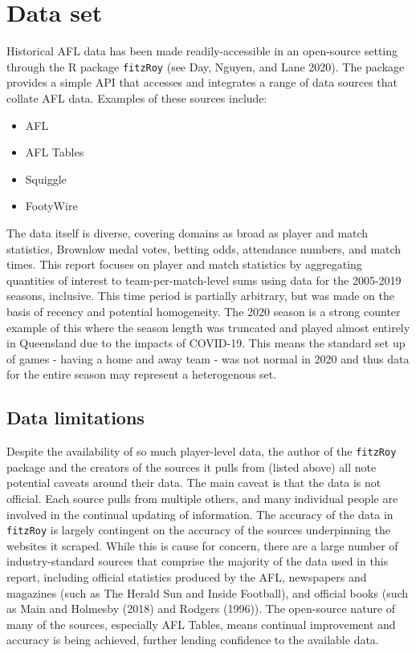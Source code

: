 \documentclass{article}
\begin{document}
\hypertarget{data-set}{%
\section{Data set}\label{data-set}}

Historical AFL data has been made readily-accessible in an open-source
setting through the R package \texttt{fitzRoy} (see Day, Nguyen, and
Lane 2020). The package provides a simple API that accesses and
integrates a range of data sources that collate AFL data. Examples of
these sources include:

\begin{itemize}
  \item{AFL}
  \item{AFL Tables}
  \item{Squiggle}
  \item{FootyWire}
\end{itemize}

The data itself is diverse, covering domains as broad as player and
match statistics, Brownlow medal votes, betting odds, attendance
numbers, and match times. This report focuses on player and match
statistics by aggregating quantities of interest to team-per-match-level
sums using data for the 2005-2019 seasons, inclusive. This time period
is partially arbitrary, but was made on the basis of recency and
potential homogeneity. The 2020 season is a strong counter example of
this where the season length was truncated and played almost entirely in
Queensland due to the impacts of COVID-19. This means the standard set
up of games - having a home and away team - was not normal in 2020 and
thus data for the entire season may represent a heterogenous set.

\hypertarget{data-limitations}{%
\subsection{Data limitations}\label{data-limitations}}

Despite the availability of so much player-level data, the author of the
\texttt{fitzRoy} package and the creators of the sources it pulls from
(listed above) all note potential caveats around their data. The main
caveat is that the data is not official. Each source pulls from multiple
others, and many individual people are involved in the continual
updating of information. The accuracy of the data in \texttt{fitzRoy} is
largely contingent on the accuracy of the sources underpinning the
websites it scraped. While this is cause for concern, there are a large
number of industry-standard sources that comprise the majority of the
data used in this report, including official statistics produced by the
AFL, newspapers and magazines (such as The Herald Sun and Inside
Football), and official books (such as Main and Holmesby (2018) and
Rodgers (1996)). The open-source nature of many of the sources,
especially AFL Tables, means continual improvement and accuracy is being
achieved, further lending confidence to the available data.
\end{document}
